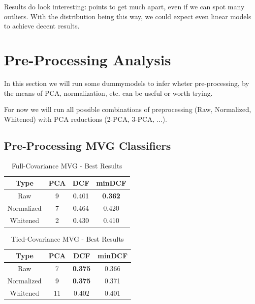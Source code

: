 \documentclass[12pt, twocolumn]{article}
\begin{document}
Results do look interesting: points to get much apart, even if we can spot many outliers.
With the distribution being this way, we could expect even linear models to achieve decent results.


\section{Pre-Processing Analysis}

In this section we will run some dummy\footnotemark models to infer wheter pre-processing, by the means of PCA, normalization, etc. can be useful or worth trying.


For now we will run all possible combinations of preprocessing (Raw, Normalized, Whitened) with PCA reductions (2-PCA, 3-PCA, ...).

\subsection{Pre-Processing MVG Classifiers}

\begin{table}[H] 
    \centering
    \begin{tabular}{||c|c|c|c||}
        \hline
        Type & PCA & DCF & minDCF \\
        \hline
        \hline
        Raw & 9 & 0.401 & {\bf 0.362}  \\
        Normalized &  7 & 0.464 & 0.420 \\
        Whitened & 2 & 0.430 & 0.410 \\
        \hline
    \end{tabular}
    \caption{Full-Covariance MVG - Best Results}
    \label{fullcovtab}
\end{table}

    
\begin{table}[H] 
    \centering
    \begin{tabular}{||c|c|c|c||}
        \hline
        Type & PCA & DCF & minDCF \\
        \hline
        \hline
        Raw & 7 & {\bf 0.375} & 0.366  \\
        Normalized &  9 & {\bf 0.375} & 0.371 \\
        Whitened & 11 & 0.402 & 0.401 \\
        \hline
    \end{tabular}
    \caption{Tied-Covariance MVG - Best Results}
    \label{tiedcovtab}
\end{table}
\end{document}
